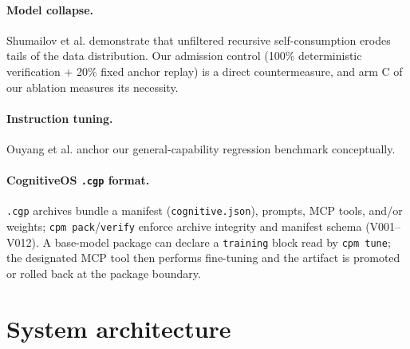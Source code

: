 \documentclass[11pt,a4paper]{article}
\begin{document}
\paragraph{Model collapse.} Shumailov et al. \cite{shumailov2024nature}
demonstrate that unfiltered recursive self-consumption erodes tails of the
data distribution. Our admission control (100\% deterministic verification +
20\% fixed anchor replay) is a direct countermeasure, and arm C of our
ablation measures its necessity.

\paragraph{Instruction tuning.} Ouyang et al. \cite{ouyang2022instructgpt}
anchor our general-capability regression benchmark conceptually.

\paragraph{CognitiveOS \texttt{.cgp} format.} \texttt{.cgp} archives bundle a
manifest (\texttt{cognitive.json}), prompts, MCP tools, and/or weights;
\texttt{cpm pack}/\texttt{verify} enforce archive integrity and manifest
schema (V001--V012). A base-model package can declare a \texttt{training}
block read by \texttt{cpm tune}; the designated MCP tool then performs
fine-tuning and the artifact is promoted or rolled back at the package
boundary.

\section{System architecture}\label{sec:arch}
\end{document}
